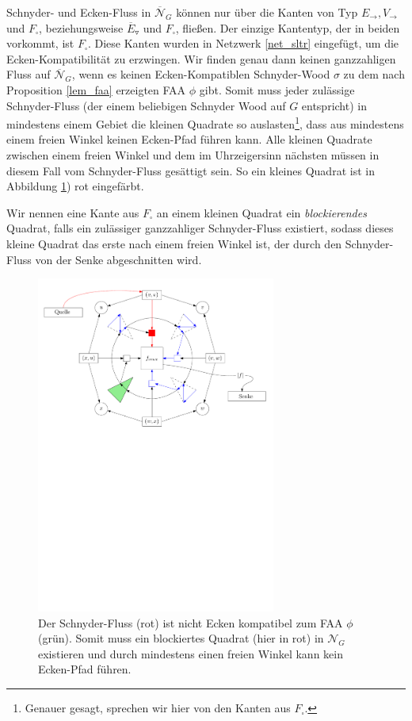 Schnyder- und Ecken-Fluss in $\overline{\mathcal{N}}_G$ können nur über die Kanten von Typ $E_\to, V_\to$ und $F_\square$, beziehungsweise $\overline{E}_\triangledown$ und $F_\square$, fließen. Der einzige Kantentyp, der in beiden vorkommt, ist $F_\square$. Diese Kanten wurden in Netzwerk \ref{net_sltr} eingefügt, um die Ecken-Kompatibilität zu erzwingen. Wir finden genau dann keinen ganzzahligen Fluss auf $\overline{\mathcal{N}}_G$, wenn es keinen Ecken-Kompatiblen Schnyder-Wood $\sigma$ zu dem nach Proposition \ref{lem_faa} erzeigten FAA $\phi$ gibt. Somit muss jeder zulässige Schnyder-Fluss (der einem beliebigen Schnyder Wood auf $G$ entspricht) in mindestens einem Gebiet die kleinen Quadrate so auslasten\footnote{Genauer gesagt, sprechen wir hier von den Kanten aus $F_\square$.}, dass aus mindestens einem freien Winkel keinen Ecken-Pfad führen kann. Alle kleinen Quadrate zwischen einem freien Winkel und dem im Uhrzeigersinn nächsten müssen in diesem Fall vom Schnyder-Fluss gesättigt sein. So ein kleines Quadrat ist in Abbildung \ref{combined_face_not_corner}) rot eingefärbt. 

Wir nennen eine Kante aus $F_\square$ an einem kleinen Quadrat ein \textit{blockierendes} Quadrat, falls ein zulässiger ganzzahliger Schnyder-Fluss existiert, sodass dieses kleine Quadrat das erste nach einem freien Winkel ist, der durch den Schnyder-Fluss von der Senke abgeschnitten wird.

\begin{figure}
	\centering
  	\includegraphics[width=0.7\textwidth]{combined_face_not_corner.pdf}
  	\caption{Der Schnyder-Fluss (rot) ist nicht Ecken kompatibel zum FAA $\phi$ (grün). Somit muss ein blockiertes Quadrat (hier in rot) in $\mathcal{N}_G$ existieren und durch mindestens einen freien Winkel kann kein Ecken-Pfad führen.}
	\label{combined_face_not_corner}
\end{figure}

